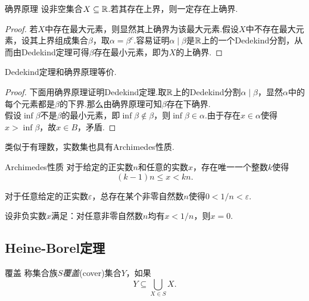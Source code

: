 \begin{theorem}{确界原理}
	设非空集合$X \subseteq \mathbb{R}$.若其存在上界，则一定存在上确界.
\end{theorem}
\begin{proof}
	若$X$中存在最大元素，则显然其上确界为该最大元素.假设$X$中不存在最大元素，设其上界组成集合$\beta$，取$\alpha = \beta ^c$.容易证明$\alpha \mid \beta$是$\mathbb{R}$上的一个Dedekind分割，从而由Dedekind定理可得$\beta$存在最小元素，即为$X$的上确界.
\end{proof}

\begin{proposition}{}
	Dedekind定理和确界原理等价.
\end{proposition}
\begin{proof}
	下面用确界原理证明Dedekind定理.取$\mathbb{R}$上的Dedekind分割$\alpha \mid \beta$，显然$\alpha$中的每个元素都是$\beta$的下界.那么由确界原理可知$\beta$存在下确界. \\
	假设$\inf \beta$不是$\beta$的最小元素，即$\inf \beta \notin \beta$，则$\inf \beta \in \alpha$.由于存在$x \in \alpha$使得$x > \inf \beta$，故$x \in B$，矛盾.
\end{proof}

类似于有理数，实数集也具有Archimedes性质.

\begin{theorem}{Archimedes性质}
	对于给定的正实数$n$和任意的实数$x$，存在唯一一个整数$k$使得$$(k-1)n \leq x < kn.$$
\end{theorem}

\begin{corollary}
	对于任意给定的正实数$\varepsilon$，总存在某个非零自然数$n$使得$0<1/n<\varepsilon$.
\end{corollary}

\begin{corollary}
	设非负实数$x$满足：对任意非零自然数$n$均有$x<1/n$，则$x=0$.
\end{corollary}

\subsection{Heine-Borel定理}

\begin{definition}{覆盖}
	称集合族$S$\textit{覆盖}(cover)集合$Y$，如果$$Y \subseteq \bigcup_{X \in S} X.$$
\end{definition}

